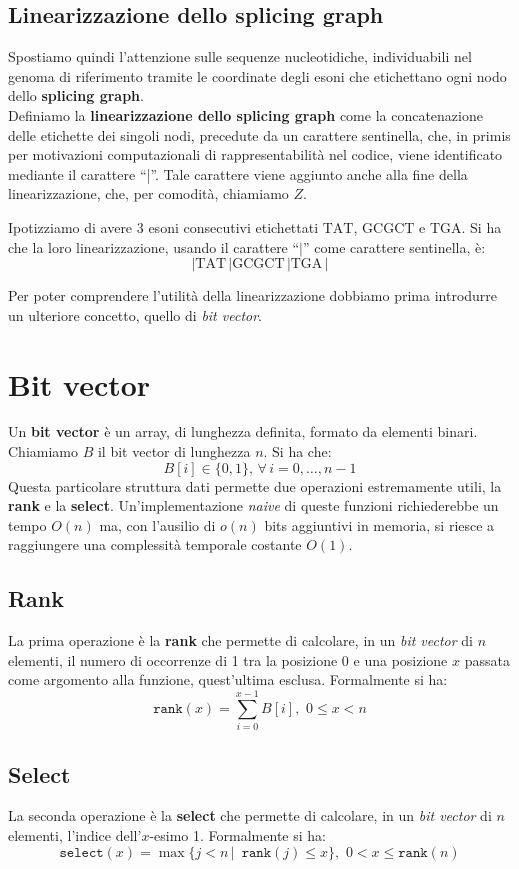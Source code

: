 \documentclass[a4paper,12pt, oneside]{book}
\begin{document}
\subsection{Linearizzazione dello splicing graph}
Spostiamo quindi l'attenzione sulle sequenze nucleotidiche, individuabili nel
genoma di riferimento tramite le coordinate degli esoni che etichettano ogni
nodo dello \textbf{splicing graph}.\\
Definiamo la \textbf{linearizzazione dello splicing graph} come la
concatenazione delle etichette dei singoli nodi, precedute da un carattere
sentinella, che, in primis per motivazioni computazionali di rappresentabilità
nel codice, viene identificato mediante il carattere ``|''. Tale carattere viene
aggiunto anche alla fine della linearizzazione, che, per comodità, chiamiamo
$Z$. 
\begin{esempio}
  Ipotizziamo di avere 3 esoni consecutivi etichettati $\mbox{TAT}$,
  $\mbox{GCGCT}$ e $\mbox{TGA}$. Si ha che la loro linearizzazione, usando il
  carattere ``$|$'' come carattere sentinella, è:
  \[|\mbox{TAT}\,|\mbox{GCGCT}\,|\mbox{TGA}\,|\]
\end{esempio}
Per poter comprendere l'utilità della linearizzazione dobbiamo prima introdurre
un ulteriore concetto, quello di \textit{bit vector}.
\section{Bit vector}
Un \textbf{bit vector} è un array, di lunghezza definita, formato da elementi
binari. Chiamiamo $B$ il bit vector di lunghezza $n$. Si ha che:
\[B[i]\in\{0,1\},\,\forall\, i=0,\ldots,n-1\]
Questa particolare struttura dati permette due operazioni estremamente utili, la
\textbf{rank} e la \textbf{select}. Un'implementazione \textit{naive} di queste
funzioni richiederebbe un tempo $O(n)$ ma, con l'ausilio di $o(n)$ bits
aggiuntivi in memoria, si riesce a raggiungere una complessità temporale
costante $O(1)$.
\subsection{Rank}
La prima operazione è la \textbf{rank} che permette di calcolare, in un
\textit{bit vector} di $n$ elementi, il numero di occorrenze di 1 tra la
posizione 0 e una posizione $x$ passata come argomento alla funzione,
quest'ultima esclusa. Formalmente si ha:
\[\mathtt{rank}(x)=\sum_{i=0}^{x-1}B[i],\,\,0\leq x< n\]
\subsection{Select}
La seconda operazione è la \textbf{select} che permette di calcolare, in un
\textit{bit vector} di $n$ elementi, l'indice dell'$x$-esimo 1. Formalmente si
ha: 
\[\mathtt{select}(x)=\max\{j<n\,|\,\,\,\mathtt{rank}(j)\leq x\},\,\,0<x\leq
  \mathtt{rank}(n)\] 
\end{document}
